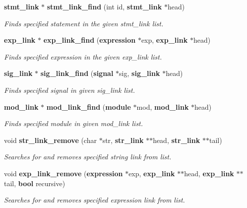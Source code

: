 \begin{CompactItemize}
{\bf stmt\_\-link} $\ast$ {\bf stmt\_\-link\_\-find} (int id, {\bf stmt\_\-link} $\ast$head)
\begin{CompactList}\small\item\em Finds specified statement in the given stmt\_\-link list. \item\end{CompactList}\item 
{\bf exp\_\-link} $\ast$ {\bf exp\_\-link\_\-find} ({\bf expression} $\ast$exp, {\bf exp\_\-link} $\ast$head)
\begin{CompactList}\small\item\em Finds specified expression in the given exp\_\-link list. \item\end{CompactList}\item 
{\bf sig\_\-link} $\ast$ {\bf sig\_\-link\_\-find} ({\bf signal} $\ast$sig, {\bf sig\_\-link} $\ast$head)
\begin{CompactList}\small\item\em Finds specified signal in given sig\_\-link list. \item\end{CompactList}\item 
{\bf mod\_\-link} $\ast$ {\bf mod\_\-link\_\-find} ({\bf module} $\ast$mod, {\bf mod\_\-link} $\ast$head)
\begin{CompactList}\small\item\em Finds specified module in given mod\_\-link list. \item\end{CompactList}\item 
void {\bf str\_\-link\_\-remove} (char $\ast$str, {\bf str\_\-link} $\ast$$\ast$head, {\bf str\_\-link} $\ast$$\ast$tail)
\begin{CompactList}\small\item\em Searches for and removes specified string link from list. \item\end{CompactList}\item 
void {\bf exp\_\-link\_\-remove} ({\bf expression} $\ast$exp, {\bf exp\_\-link} $\ast$$\ast$head, {\bf exp\_\-link} $\ast$$\ast$tail, {\bf bool} recursive)
\begin{CompactList}\small\item\em Searches for and removes specified expression link from list. \item\end{CompactList}\item 

\end{CompactItemize}
